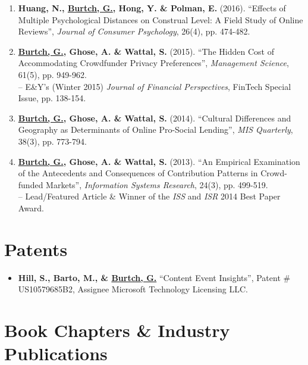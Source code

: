 \documentclass[10.5pt,letterpaper,sans]{moderncv}        %
\begin{document}
\begin{enumerate}[leftmargin=!,labelindent=5pt,itemindent=-15pt]
\item \textbf{Huang, N., \underline{Burtch, G.}, Hong, Y. \& Polman, E.} (2016). ``Effects of Multiple Psychological Distances on Construal Level: A Field Study of Online Reviews'', \textit{Journal of Consumer Psychology}, 26(4), pp. 474-482.

\item \textbf{\underline{Burtch, G.}, Ghose, A. \& Wattal, S.} (2015). ``The Hidden Cost of Accommodating Crowdfunder Privacy Preferences'', \textit{Management Science}, 61(5), pp. 949-962. \\-- E\&Y's (Winter 2015) \textit{Journal of Financial Perspectives}, FinTech Special Issue, pp. 138-154.

\item \textbf{\underline{Burtch, G.}, Ghose, A. \& Wattal, S.} (2014). ``Cultural Differences and Geography as Determinants of Online Pro-Social Lending'', \textit{MIS Quarterly}, 38(3), pp. 773-794.

\item \textbf{\underline{Burtch, G.}, Ghose, A. \& Wattal, S.} (2013). ``An Empirical Examination of the Antecedents and Consequences of Contribution Patterns in Crowd-funded Markets'', \textit{Information Systems Research}, 24(3), pp. 499-519. \\-- Lead/Featured Article \& Winner of the \textit{ISS} and \textit{ISR} 2014 Best Paper Award.

\end{enumerate}

\section{Patents}

\begin{itemize}[leftmargin=!,labelindent=5pt,itemindent=-15pt]

\item \textbf{Hill, S., Barto, M., \& \underline{Burtch, G.}} ``Content Event Insights'', Patent \# US10579685B2, Assignee\: Microsoft Technology Licensing LLC.

\end{itemize}

\vspace{4 pt}

\section{Book Chapters \& Industry Publications}
\end{document}
